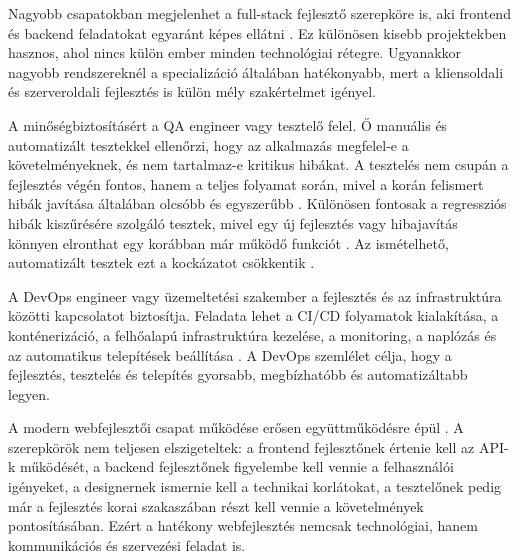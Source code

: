 Nagyobb csapatokban megjelenhet a full-stack fejlesztő szerepköre is, aki frontend és backend feladatokat egyaránt képes ellátni \cite{awsFullStackDevelopment}. Ez különösen kisebb projektekben hasznos, ahol nincs külön ember minden technológiai rétegre. Ugyanakkor nagyobb rendszereknél a specializáció általában hatékonyabb, mert a kliensoldali és szerveroldali fejlesztés is külön mély szakértelmet igényel.

A minőségbiztosításért a QA engineer vagy tesztelő felel. Ő manuális és automatizált tesztekkel ellenőrzi, hogy az alkalmazás megfelel-e a követelményeknek, és nem tartalmaz-e kritikus hibákat. A tesztelés nem csupán a fejlesztés végén fontos, hanem a teljes folyamat során, mivel a korán felismert hibák javítása általában olcsóbb és egyszerűbb \cite{ibmShiftLeftTesting}. Különösen fontosak a regressziós hibák kiszűrésére szolgáló tesztek, mivel egy új fejlesztés vagy hibajavítás könnyen elronthat egy korábban már működő funkciót \cite{istqbGlossaryRegressionTesting}. Az ismételhető, automatizált tesztek ezt a kockázatot csökkentik \cite{istqbGlossaryTestAutomation}.

A DevOps engineer vagy üzemeltetési szakember a fejlesztés és az infrastruktúra közötti kapcsolatot biztosítja. Feladata lehet a CI/CD folyamatok kialakítása, a konténerizáció, a felhőalapú infrastruktúra kezelése, a monitoring, a naplózás és az automatikus telepítések beállítása \cite{atlassianDevOps,awsCicd}. A DevOps szemlélet célja, hogy a fejlesztés, tesztelés és telepítés gyorsabb, megbízhatóbb és automatizáltabb legyen.

A modern webfejlesztői csapat működése erősen együttműködésre épül \cite{agileManifesto2001}. A szerepkörök nem teljesen elszigeteltek: a frontend fejlesztőnek értenie kell az API-k működését, a backend fejlesztőnek figyelembe kell vennie a felhasználói igényeket, a designernek ismernie kell a technikai korlátokat, a tesztelőnek pedig már a fejlesztés korai szakaszában részt kell vennie a követelmények pontosításában. Ezért a hatékony webfejlesztés nemcsak technológiai, hanem kommunikációs és szervezési feladat is.
